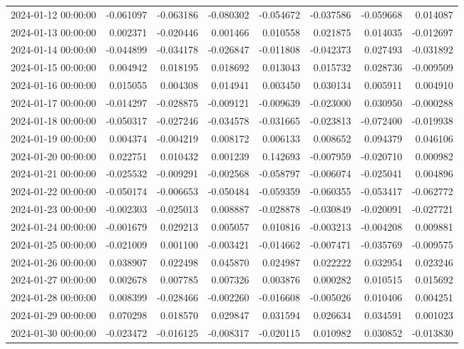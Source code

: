 \begin{tabular}{lrrrrrrr}
2024-01-12 00:00:00 & -0.061097 & -0.063186 & -0.080302 & -0.054672 & -0.037586 & -0.059668 & 0.014087 \\
2024-01-13 00:00:00 & 0.002371 & -0.020446 & 0.001466 & 0.010558 & 0.021875 & 0.014035 & -0.012697 \\
2024-01-14 00:00:00 & -0.044899 & -0.034178 & -0.026847 & -0.011808 & -0.042373 & 0.027493 & -0.031892 \\
2024-01-15 00:00:00 & 0.004942 & 0.018195 & 0.018692 & 0.013043 & 0.015732 & 0.028736 & -0.009509 \\
2024-01-16 00:00:00 & 0.015055 & 0.004308 & 0.014941 & 0.003450 & 0.030134 & 0.005911 & 0.004910 \\
2024-01-17 00:00:00 & -0.014297 & -0.028875 & -0.009121 & -0.009639 & -0.023000 & 0.030950 & -0.000288 \\
2024-01-18 00:00:00 & -0.050317 & -0.027246 & -0.034578 & -0.031665 & -0.023813 & -0.072400 & -0.019938 \\
2024-01-19 00:00:00 & 0.004374 & -0.004219 & 0.008172 & 0.006133 & 0.008652 & 0.094379 & 0.046106 \\
2024-01-20 00:00:00 & 0.022751 & 0.010432 & 0.001239 & 0.142693 & -0.007959 & -0.020710 & 0.000982 \\
2024-01-21 00:00:00 & -0.025532 & -0.009291 & -0.002568 & -0.058797 & -0.006074 & -0.025041 & 0.004896 \\
2024-01-22 00:00:00 & -0.050174 & -0.006653 & -0.050484 & -0.059359 & -0.060355 & -0.053417 & -0.062772 \\
2024-01-23 00:00:00 & -0.002303 & -0.025013 & 0.008887 & -0.028878 & -0.030849 & -0.020091 & -0.027721 \\
2024-01-24 00:00:00 & -0.001679 & 0.029213 & 0.005057 & 0.010816 & -0.003213 & -0.004208 & 0.009881 \\
2024-01-25 00:00:00 & -0.021009 & 0.001100 & -0.003421 & -0.014662 & -0.007471 & -0.035769 & -0.009575 \\
2024-01-26 00:00:00 & 0.038907 & 0.022498 & 0.045870 & 0.024987 & 0.022222 & 0.032954 & 0.023246 \\
2024-01-27 00:00:00 & 0.002678 & 0.007785 & 0.007326 & 0.003876 & 0.000282 & 0.010515 & 0.015692 \\
2024-01-28 00:00:00 & 0.008399 & -0.028466 & -0.002260 & -0.016608 & -0.005026 & 0.010406 & 0.004251 \\
2024-01-29 00:00:00 & 0.070298 & 0.018570 & 0.029847 & 0.031594 & 0.026634 & 0.034591 & 0.001023 \\
2024-01-30 00:00:00 & -0.023472 & -0.016125 & -0.008317 & -0.020115 & 0.010982 & 0.030852 & -0.013830 \\

\end{tabular}
